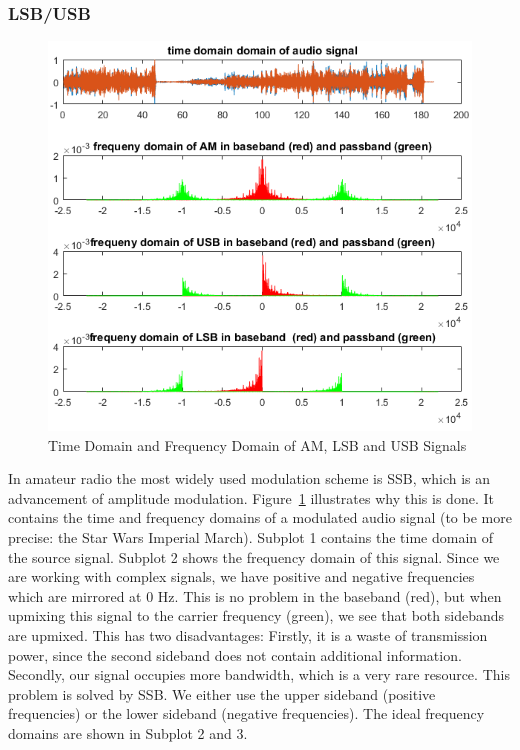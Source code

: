 \subsubsection{LSB/USB}
\label{subsubsec:lsbusb}
\begin{figure}
	\centering
	\includegraphics[width=1.3\linewidth]{gfx/ssb_plots.png}
	\caption{Time Domain and Frequency Domain of AM, LSB and USB Signals}
	\label{fig:impl:f3ssb}
\end{figure}


In amateur radio the most widely used modulation scheme is \ac{SSB}, which is an advancement of amplitude modulation. Figure~\ref{fig:impl:f3ssb} illustrates why this is done. It contains the time and frequency domains of a modulated audio signal (to be more precise: the Star Wars Imperial March). Subplot 1 contains the time domain of the source signal. Subplot 2 shows the frequency domain of this signal. Since we are working with complex signals, we have positive and negative frequencies which are mirrored at 0 Hz. This is no problem in the baseband (red), but when upmixing this signal to the carrier frequency (green), we see that both sidebands are upmixed. This has two disadvantages: Firstly, it is a waste of transmission power, since the second sideband does not contain additional information. Secondly, our signal occupies more bandwidth, which is a very rare resource. 
This problem is solved by SSB. We either use the upper sideband (positive frequencies) or the lower sideband (negative frequencies). The ideal frequency domains are shown in Subplot 2 and 3. 

